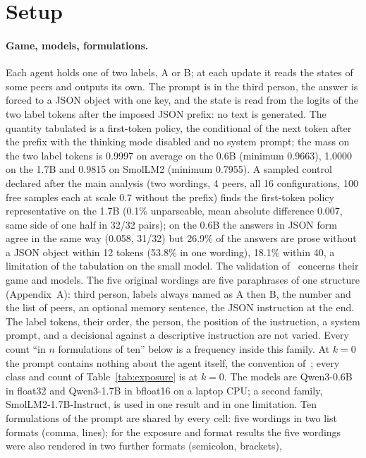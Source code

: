 \documentclass[11pt]{article}
\begin{document}
\section{Setup}

\paragraph{Game, models, formulations.} Each agent holds one of two labels,
A or B; at each update it reads the states of some peers and outputs its
own. The prompt is in the third person, the answer is forced to a JSON
object with one key, and the state is read from the logits of the two
label tokens after the imposed JSON prefix: no text is generated. The
quantity tabulated is a first-token policy, the conditional of the next
token after the prefix with the thinking mode disabled and no system
prompt; the mass on the two label tokens is 0.9997 on average on the
0.6B (minimum 0.9663), 1.0000 on the 1.7B and 0.9815 on SmolLM2
(minimum 0.7955). A sampled control declared after the main analysis (two
wordings, 4 peers, all 16 configurations, 100 free samples each at scale 0.7
without the prefix) finds the first-token policy representative on the
1.7B (0.1\% unparseable, mean absolute difference 0.007, same side of
one half in 32/32 pairs); on the 0.6B the answers in JSON form agree in the
same way (0.058, 31/32) but 26.9\% of the answers are prose without
a JSON object within 12 tokens (53.8\% in one wording), 18.1\% within 40, a limitation of the tabulation on the small model. The validation of~\cite{flint2026}
concerns their game and models. The five original wordings are five paraphrases of one structure (Appendix~A): third
person, labels always named as A then B, the number and the list of peers,
an optional memory sentence, the JSON instruction at the end. The label tokens, their order, the person, the position of the instruction, a system prompt, and a decisional against a descriptive instruction are not varied. Every count ``in $n$ formulations of ten'' below is a
frequency inside this family. At $k=0$ the prompt contains nothing about
the agent itself, the convention of~\cite{demarzo2026}; every class and
count of Table~\ref{tab:exposure} is at $k=0$. The models are
Qwen3-0.6B in float32 and Qwen3-1.7B in bfloat16 on a laptop CPU; a second
family, SmolLM2-1.7B-Instruct, is used in one result and in one limitation. Ten
formulations of the prompt are shared by every cell: five wordings in two
list formats (comma, lines); for the exposure and format results the five
wordings were also rendered in two further formats (semicolon, brackets),
\end{document}
